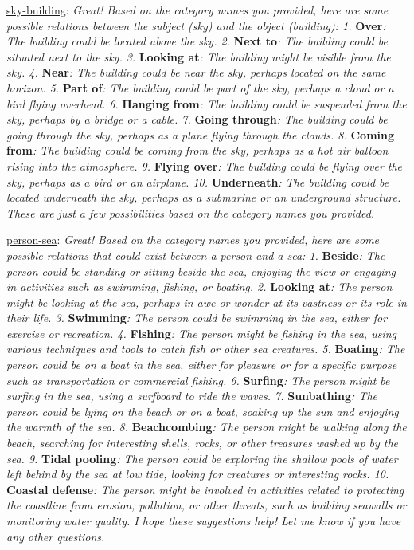 \underline{sky-building}: \textit{Great! Based on the category names you provided, here are some possible relations between the subject (sky) and the object (building): 1.} \textbf{Over}\textit{: The building could be located above the sky. 2.} \textbf{Next to}\textit{: The building could be situated next to the sky. 3.} \textbf{Looking at}\textit{: The building might be visible from the sky. 4.} \textbf{Near}\textit{: The building could be near the sky, perhaps located on the same horizon. 5.} \textbf{Part of}\textit{: The building could be part of the sky, perhaps a cloud or a bird flying overhead. 6.} \textbf{Hanging from}\textit{: The building could be suspended from the sky, perhaps by a bridge or a cable. 7.} \textbf{Going through}\textit{: The building could be going through the sky, perhaps as a plane flying through the clouds. 8.} \textbf{Coming from}\textit{: The building could be coming from the sky, perhaps as a hot air balloon rising into the atmosphere. 9.} \textbf{Flying over}\textit{: The building could be flying over the sky, perhaps as a bird or an airplane. 10.} \textbf{Underneath}\textit{: The building could be located underneath the sky, perhaps as a submarine or an underground structure. These are just a few possibilities based on the category names you provided.}

\underline{person-sea}: \textit{Great! Based on the category names you provided, here are some possible relations that could exist between a person and a sea: 1.} \textbf{Beside}\textit{: The person could be standing or sitting beside the sea, enjoying the view or engaging in activities such as swimming, fishing, or boating. 2.} \textbf{Looking at}\textit{: The person might be looking at the sea, perhaps in awe or wonder at its vastness or its role in their life. 3.} \textbf{Swimming}\textit{: The person could be swimming in the sea, either for exercise or recreation. 4.} \textbf{Fishing}\textit{: The person might be fishing in the sea, using various techniques and tools to catch fish or other sea creatures. 5.} \textbf{Boating}\textit{: The person could be on a boat in the sea, either for pleasure or for a specific purpose such as transportation or commercial fishing. 6.} \textbf{Surfing}\textit{: The person might be surfing in the sea, using a surfboard to ride the waves. 7.} \textbf{Sunbathing}\textit{: The person could be lying on the beach or on a boat, soaking up the sun and enjoying the warmth of the sea. 8.} \textbf{Beachcombing}\textit{: The person might be walking along the beach, searching for interesting shells, rocks, or other treasures washed up by the sea. 9.} \textbf{Tidal pooling}\textit{: The person could be exploring the shallow pools of water left behind by the sea at low tide, looking for creatures or interesting rocks. 10.} \textbf{Coastal defense}\textit{: The person might be involved in activities related to protecting the coastline from erosion, pollution, or other threats, such as building seawalls or monitoring water quality. I hope these suggestions help! Let me know if you have any other questions.}

